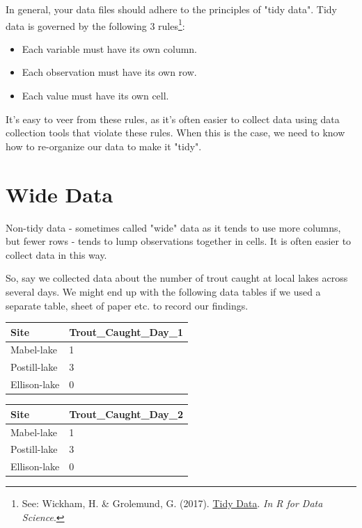 \documentclass[
]{book}
\providecommand{\tightlist}{%
  \setlength{\itemsep}{0pt}\setlength{\parskip}{0pt}}
\begin{document}
In general, your data files should adhere to the principles of "tidy data". Tidy data is governed by the following 3 rules\footnote{See: Wickham, H. \& Grolemund, G. (2017). \href{https://r4ds.had.co.nz/tidy-data.html}{Tidy Data}. \emph{In R for Data Science}.}:

\begin{itemize}
\tightlist
\item
  Each variable must have its own column.
\item
  Each observation must have its own row.
\item
  Each value must have its own cell.
\end{itemize}

It's easy to veer from these rules, as it's often easier to collect data using data collection tools that violate these rules. When this is the case, we need to know how to re-organize our data to make it "tidy".

\hypertarget{wide-data}{%
\section{Wide Data}\label{wide-data}}

Non-tidy data - sometimes called "wide" data as it tends to use more columns, but fewer rows - tends to lump observations together in cells. It is often easier to collect data in this way.

So, say we collected data about the number of trout caught at local lakes across several days. We might end up with the following data tables if we used a separate table, sheet of paper etc. to record our findings.

\begin{longtable}[]{@{}ll@{}}
\toprule
Site & Trout\_Caught\_Day\_1 \\
\midrule
\endhead
Mabel-lake & 1 \\
Postill-lake & 3 \\
Ellison-lake & 0 \\
\bottomrule
\end{longtable}

\begin{longtable}[]{@{}ll@{}}
\toprule
Site & Trout\_Caught\_Day\_2 \\
\midrule
\endhead
Mabel-lake & 1 \\
Postill-lake & 3 \\
Ellison-lake & 0 \\
\bottomrule
\end{longtable}
\end{document}
